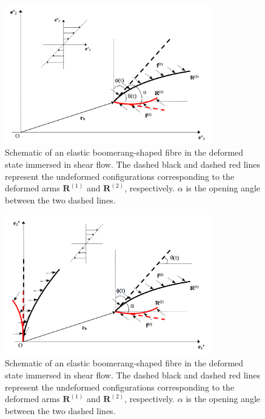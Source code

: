 \documentclass[lineno]{JFM-FLM_Au}
\begin{document}
\begin{figure}[!h]
	\begin{center}
		\includegraphics[width=0.8\textwidth]{plot/fluid.png}
		\caption{Schematic of an elastic boomerang-shaped fibre in the deformed state immersed in shear flow. The dashed black and dashed red lines represent the undeformed configurations corresponding to the deformed arms $\mathbf{R}^{(1)}$ and $\mathbf{R}^{(2)}$, respectively. $\alpha$ is the opening angle between the two dashed lines.} 
		\label{fig:6}
	\end{center}
\end{figure}
\begin{figure}[htb]
	\begin{center}
		\includegraphics[width=0.8\textwidth]{plot/elastic_case/deformed_config.png}
		\caption{Schematic of an elastic boomerang-shaped fibre in the deformed state immersed in shear flow. The dashed black and dashed red lines represent the undeformed configurations corresponding to the deformed arms $\mathbf{R}^{(1)}$ and $\mathbf{R}^{(2)}$, respectively. $\alpha$ is the opening angle between the two dashed lines.}
		\label{fig:22}
	\end{center}
\end{figure}
\end{document}
